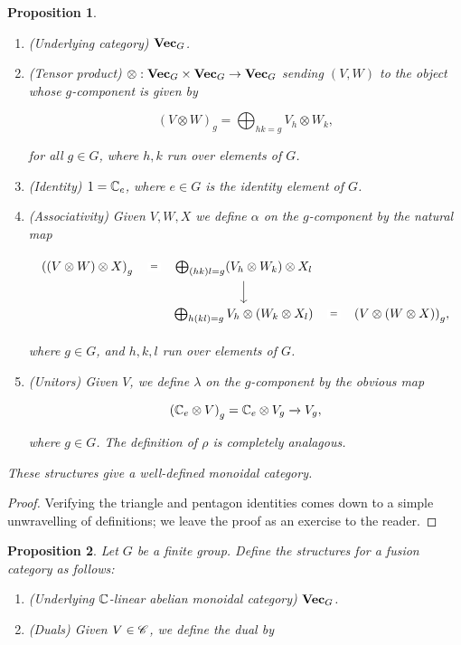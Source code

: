 \documentclass{article}
\newtheorem{proposition}{Proposition}[section]
\theoremstyle{definition}
\numberwithin{figure}{section}
\begin{document}
\begin{enumerate}[\thesection .1.]
\begin{proposition}
\begin{enumerate}
\item (Underlying category) $\bold{Vec}_G$.

\item (Tensor product) $\otimes: \bold{Vec}_G\times \bold{Vec}_G \to \bold{Vec}_G$ sending $(V,W)$ to the object whose $g$-component is given by

$$\left(V\otimes W\right)_g=\bigoplus_{hk=g}V_h\otimes W_k,$$

for all $g\in G$, where $h,k$ run over elements of $G$.

\item (Identity) $1=\mathbb{C}_e$, where $e\in G$ is the identity element of $G$.

\item (Associativity) Given $V,W,X$ we define $\alpha$ on the $g$-component by the natural map

\[\begin{tikzcd}
	{\left(\left(V\otimes W\right)\otimes X\right)_g} & {\bigoplus_{(hk)l=g} (V_h\otimes W_k)\otimes X_l} \\
	& {\bigoplus_{h(kl)=g}V_h\otimes\left(W_k\otimes X_l\right)} & {\left(V\otimes \left(W\otimes X\right)\right)_g},
	\arrow["{=}"{description}, draw=none, from=1-1, to=1-2]
	\arrow["", from=1-2, to=2-2]
	\arrow["{=}"{description}, draw=none, from=2-2, to=2-3]
\end{tikzcd}\]

where $g\in G$, and $h,k,l$ run over elements of $G$. 
\item (Unitors) Given $V$, we define $\lambda$ on the $g$-component by the obvious map

$$\left(\mathbb{C}_e\otimes V\right)_g = \mathbb{C}_e\otimes V_g \xrightarrow{} V_g,$$

where $g\in G$.  The definition of $\rho$ is completely analagous.
\end{enumerate}

These structures give a well-defined monoidal category.
\end{proposition}
\begin{proof} Verifying the triangle and pentagon identities comes down to a simple unwravelling of definitions; we leave the proof as an exercise to the reader.
\end{proof}

\begin{proposition} Let $G$ be a finite group. Define the structures for a fusion category as follows:

\begin{enumerate}
\item (Underlying $\mathbb{C}$-linear abelian monoidal category) $\bold{Vec}_G$.
\item (Duals) Given $V\in \mathscr{C}$, we define the dual by


\end{enumerate}
\end{proposition}
\end{enumerate}
\end{document}
